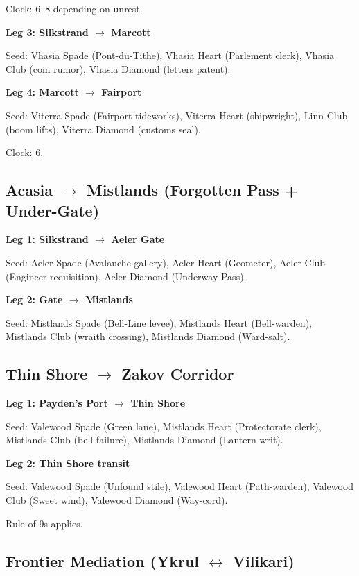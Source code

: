 Clock: 6--8 depending on unrest.

\textbf{Leg 3: Silkstrand $\rightarrow$ Marcott}

Seed: Vhasia Spade (Pont-du-Tithe), Vhasia Heart (Parlement clerk), Vhasia Club (coin rumor), Vhasia Diamond (letters patent).

\textbf{Leg 4: Marcott $\rightarrow$ Fairport}

Seed: Viterra Spade (Fairport tideworks), Viterra Heart (shipwright), Linn Club (boom lifts), Viterra Diamond (customs seal).

Clock: 6.

\subsection{Acasia $\rightarrow$ Mistlands (Forgotten Pass + Under-Gate)}

\textbf{Leg 1: Silkstrand $\rightarrow$ Aeler Gate}

Seed: Aeler Spade (Avalanche gallery), Aeler Heart (Geometer), Aeler Club (Engineer requisition), Aeler Diamond (Underway Pass).

\textbf{Leg 2: Gate $\rightarrow$ Mistlands}

Seed: Mistlands Spade (Bell-Line levee), Mistlands Heart (Bell-warden), Mistlands Club (wraith crossing), Mistlands Diamond (Ward-salt).

\subsection{Thin Shore $\rightarrow$ Zakov Corridor}

\textbf{Leg 1: Payden's Port $\rightarrow$ Thin Shore}

Seed: Valewood Spade (Green lane), Mistlands Heart (Protectorate clerk), Mistlands Club (bell failure), Mistlands Diamond (Lantern writ).

\textbf{Leg 2: Thin Shore transit}

Seed: Valewood Spade (Unfound stile), Valewood Heart (Path-warden), Valewood Club (Sweet wind), Valewood Diamond (Way-cord).

Rule of 9s applies.

\subsection{Frontier Mediation (Ykrul $\leftrightarrow$ Vilikari)}

